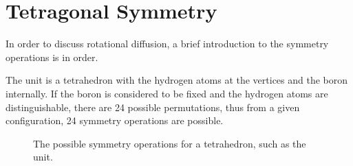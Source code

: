 \section{Tetragonal Symmetry}
\label{sec:symmetry}
In order to discuss rotational diffusion, a brief introduction to the  symmetry operations is in order.

The  unit is a tetrahedron with the hydrogen atoms at the vertices and the boron internally.
If the boron is considered to be fixed and the hydrogen atoms are distinguishable, there are 24 possible permutations, thus from a given configuration, 24 symmetry operations are possible.

\begin{figure}[h!]
  \begin{center}
\newline
    \parbox{0.85\linewidth}{
      \caption{The possible symmetry operations for a tetrahedron, such as the  unit.
      }
      \label{fig:symmetry}
    }
  \end{center}
\end{figure}

